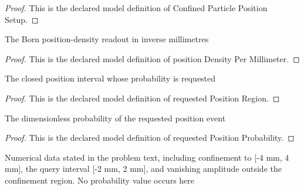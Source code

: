 \begin{proof}
  This is the declared model definition of Confined Particle Position Setup.
\end{proof}
\begin{definition}
  \label{def:physics:phyx-mini-0652:phyxminiproblems-problemphyxmini0652-positiondensitypermillimeter}
  The Born position-density readout in inverse millimetres
\end{definition}
\begin{proof}
  This is the declared model definition of position Density Per Millimeter.
\end{proof}
\begin{definition}
  \label{def:physics:phyx-mini-0652:phyxminiproblems-problemphyxmini0652-requestedpositionregion}
  The closed position interval whose probability is requested
\end{definition}
\begin{proof}
  This is the declared model definition of requested Position Region.
\end{proof}
\begin{definition}
  \label{def:physics:phyx-mini-0652:phyxminiproblems-problemphyxmini0652-requestedpositionprobability}
  The dimensionless probability of the requested position event
\end{definition}
\begin{proof}
  This is the declared model definition of requested Position Probability.
\end{proof}
\begin{definition}
  \label{def:physics:phyx-mini-0652:phyxminiproblems-problemphyxmini0652-matchesconfinedparticlescenario}
  Numerical data stated in the problem text, including confinement to [-4 mm, 4 mm], the query interval [-2 mm, 2 mm], and vanishing amplitude outside the confinement region. No probability value occurs here
\end{definition}
